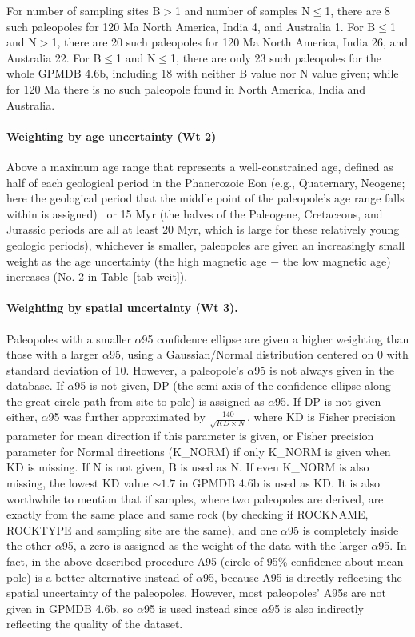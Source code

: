 For number of sampling sites B$>$1 and number of samples N$\leq$1, there are 8
such paleopoles for 120 Ma North America, India 4, and Australia 1.
For B$\leq$1 and N$>$1, there are 20 such paleopoles for 120 Ma
North America, India 26, and Australia 22. For B$\leq$1 and N$\leq$1, there are
only 23 such paleopoles for the whole GPMDB 4.6b, including 18 with neither B
value nor N value given; while for 120 Ma there is no such paleopole
found in North America, India and Australia.

\paragraph{Weighting by age uncertainty (Wt 2)} Above a maximum age range
that represents a well-constrained age, defined as half of each geological
period in the Phanerozoic Eon (e.g., Quaternary, Neogene; here the geological
period that the middle point of the paleopole's age range falls within is
assigned)~\citep{v90,T19} or 15 Myr (the halves of the Paleogene, Cretaceous,
and Jurassic periods are all at least 20 Myr, which is large for these
relatively young geologic periods), whichever is smaller, paleopoles are given
an increasingly small weight as the age uncertainty (the high magnetic age $-$
the low magnetic age) increases (No. 2 in Table~\ref{tab-weit}).

\paragraph{Weighting by spatial uncertainty (Wt 3).} Paleopoles with a
smaller $\alpha$95 confidence ellipse are given a higher weighting than those
with a larger $\alpha$95, using a Gaussian/Normal distribution centered on 0
with standard deviation of 10. However, a paleopole's $\alpha$95 is not always
given in the database. If $\alpha$95 is not given, DP (the semi-axis of the
confidence ellipse along the great circle path from site to pole) is assigned as
$\alpha$95. If DP is not given either, $\alpha$95 was further approximated by
$\frac{140}{\sqrt{KD\times{}N}}$, where KD is Fisher precision parameter for
mean direction if this parameter is given, or Fisher precision parameter for
Normal directions (K\_NORM) if only K\_NORM is given when KD is missing. If N is
not given, B is used as N. If even K\_NORM is also missing, the lowest KD value
${\sim}1.7$ in GPMDB 4.6b is used as KD\@. It is also worthwhile to mention that
if samples, where two paleopoles are derived, are exactly from the same place
and same rock (by checking if ROCKNAME, ROCKTYPE and sampling site are the
same), and one $\alpha$95 is completely inside the other $\alpha$95, a zero is
assigned as the weight of the data with the larger $\alpha$95. In fact, in the
above described procedure A95 (circle of 95\% confidence about mean pole) is a
better alternative instead of $\alpha$95, because A95 is directly reflecting the
spatial uncertainty of the paleopoles. However, most paleopoles' A95s are not
given in GPMDB 4.6b, so $\alpha$95 is used instead since $\alpha$95 is also
indirectly reflecting the quality of the dataset.


